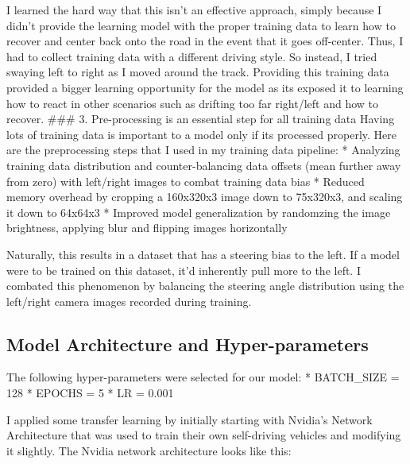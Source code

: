 \documentclass[11pt]{article}
\begin{document}
I learned the hard way that this isn't an effective approach, simply
because I didn't provide the learning model with the proper training
data to learn how to recover and center back onto the road in the event
that it goes off-center. Thus, I had to collect training data with a
different driving style. So instead, I tried swaying left to right as I
moved around the track. Providing this training data provided a bigger
learning opportunity for the model as its exposed it to learning how to
react in other scenarios such as drifting too far right/left and how to
recover. \#\#\# 3. Pre-processing is an essential step for all training
data Having lots of training data is important to a model only if its
processed properly. Here are the preprocessing steps that I used in my
training data pipeline: * Analyzing training data distribution and
counter-balancing data offsets (mean further away from zero) with
left/right images to combat training data bias * Reduced memory overhead
by cropping a 160x320x3 image down to 75x320x3, and scaling it down to
64x64x3 * Improved model generalization by randomzing the image
brightness, applying blur and flipping images horizontally

Naturally, this results in a dataset that has a steering bias to the
left. If a model were to be trained on this dataset, it'd inherently
pull more to the left. I combated this phenomenon by balancing the
steering angle distribution using the left/right camera images recorded
during training.

\subsection{Model Architecture and
Hyper-parameters}\label{model-architecture-and-hyper-parameters}

The following hyper-parameters were selected for our model: *
BATCH\_SIZE = 128 * EPOCHS = 5 * LR = 0.001

I applied some transfer learning by initially starting with Nvidia's
Network Architecture that was used to train their own self-driving
vehicles and modifying it slightly. The Nvidia network architecture
looks like this:
\end{document}
